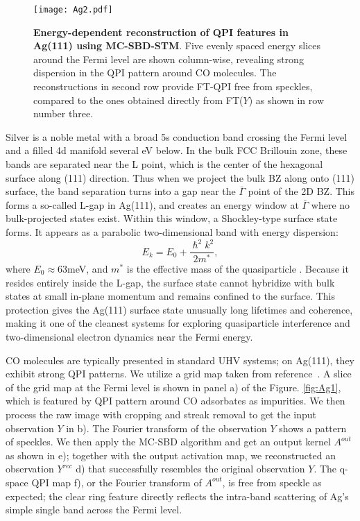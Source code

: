 \begin{figure}
	\texttt{[image: Ag2.pdf]} 
	\centering
	\caption[\textbf{Energy-dependent reconstruction of QPI features in Ag(111) using MC-SBD-STM}]{\textbf{Energy-dependent reconstruction of QPI features in Ag(111) using MC-SBD-STM}. Five evenly spaced energy slices around the Fermi level are shown column-wise, revealing strong dispersion in the QPI pattern around CO molecules. The reconstructions in second row provide FT-QPI free from speckles, compared to the ones obtained directly from FT($Y$) as shown in row number three.}
	\label{fig:Ag2}
\end{figure}

Silver is a noble metal with a broad 5s conduction band crossing the Fermi level and a filled 4d manifold several eV below. In the bulk FCC Brillouin zone, these bands are separated near the L point, which is the center of the hexagonal surface along (111) direction. Thus when we project the bulk BZ along onto (111) surface, the band separation turns into a gap near the $\bar{\Gamma}$ point of the 2D BZ. This forms a so-called L-gap in Ag(111), and creates an energy window at $\bar{\Gamma}$ where no bulk-projected states exist. Within this window, a Shockley-type surface state forms\cite{bendounanEvolutionRashbaSpinorbitsplit2011,burgiQuantumCoherenceLifetimes2000}. It appears as a parabolic two-dimensional band with energy dispersion:
\begin{equation}
	E_{k} = E_0 + \frac{\hslash^2k^2}{2m^*}, 
\end{equation}
where $E_0 \approx 63$meV, and $m^*$ is the effective mass of the quasiparticle \cite{paniagoTemperatureDependenceShockleytype1995}. Because it resides entirely inside the L-gap, the surface state cannot hybridize with bulk states at small in-plane momentum and remains confined to the surface. This protection gives the Ag(111) surface state unusually long lifetimes and coherence, making it one of the cleanest systems for exploring quasiparticle interference and two-dimensional electron dynamics near the Fermi energy. 
 
CO molecules are typically presented in standard UHV systems; on Ag(111), they exhibit strong QPI patterns. We utilize a grid map taken from reference~\cite{grotheQuantifyingManyBodyEffects2013a}. A slice of the grid map at the Fermi level is shown in panel a) of the Figure. \ref{fig:Ag1}, which is featured by QPI pattern around CO adsorbates as impurities. We then process the raw image with cropping and streak removal to get the input observation $Y$ in b). The Fourier transform of the observation $Y$ shows a pattern of speckles. We then apply the \ac{MC-SBD} algorithm and get an output kernel $A^{out}$ as shown in e); together with the output activation map, we reconstructed an observation $Y^{rec}$ d) that successfully resembles the original observation $Y$. The q-space QPI map f), or the Fourier transform of $A^{out}$, is free from speckle as expected; the clear ring feature directly reflects the intra-band scattering of Ag's simple single band across the Fermi level. 

